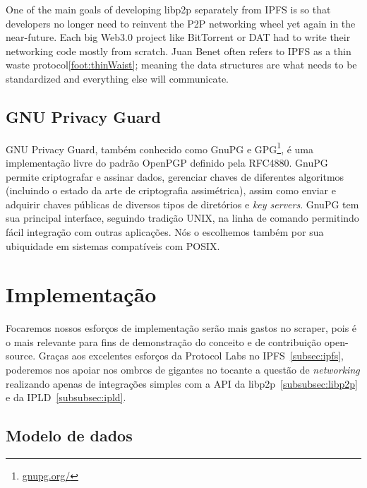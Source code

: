 One of the main goals of developing libp2p separately from IPFS is so that developers no longer need to reinvent the P2P networking wheel yet again in the near-future.
Each big Web3.0 project like BitTorrent or DAT had to write their networking code mostly from scratch.
Juan Benet often refers to IPFS as a thin waste protocol\ref{foot:thinWaist}; meaning the data structures are what needs to be standardized and everything else will communicate.

\subsection{GNU Privacy Guard}

GNU Privacy Guard, também conhecido como GnuPG e GPG\footnote{\url{gnupg.org/}}, é uma implementação livre do padrão OpenPGP definido pela RFC4880.
GnuPG permite criptografar e assinar dados, gerenciar chaves de diferentes algoritmos (incluindo o estado da arte de criptografia assimétrica), assim como enviar e adquirir chaves públicas de diversos tipos de diretórios e \textit{key servers}.
GnuPG tem sua principal interface, seguindo tradição UNIX, na linha de comando permitindo fácil integração com outras aplicações.
Nós o escolhemos também por sua ubiquidade em sistemas compatíveis com POSIX.

\section{Implementação}

Focaremos nossos esforços de implementação serão mais gastos no scraper, pois é o mais relevante para fins de demonstração do conceito e de contribuição open-source.
Graças aos excelentes esforços da Protocol Labs no IPFS~\ref{subsec:ipfs}, poderemos nos apoiar nos ombros de gigantes no tocante a questão de \textit{networking} realizando apenas de integrações simples com a API da libp2p~\ref{subsubsec:libp2p} e da IPLD~\ref{subsubsec:ipld}.

\subsection{Modelo de dados}

